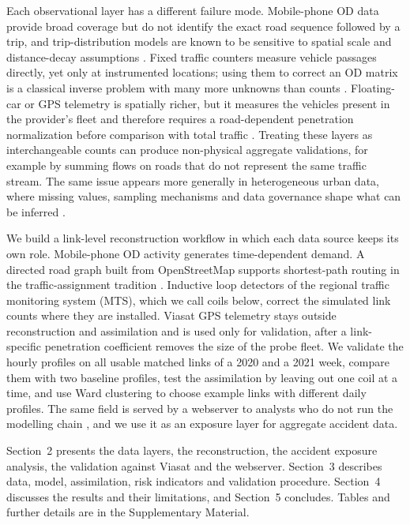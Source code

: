 \documentclass[pdflatex,Numbered]{sn-jnl}
\begin{document}
Each observational layer has a different failure mode. Mobile-phone OD data provide broad coverage but do not identify the exact road sequence followed by a trip, and trip-distribution models are known to be sensitive to spatial scale and distance-decay assumptions \cite{simini2012,lenormand2016,halas2014,martinez2013}. Fixed traffic counters measure vehicle passages directly, yet only at instrumented locations; using them to correct an OD matrix is a classical inverse problem with many more unknowns than counts \cite{cascetta1984}. Floating-car or GPS telemetry is spatially richer, but it measures the vehicles present in the provider's fleet and therefore requires a road-dependent penetration normalization before comparison with total traffic
\cite{herrera2010,work2010,seo2015,seo2017}. Treating these layers as interchangeable counts can produce non-physical aggregate validations, for example by summing
flows on roads that do not represent the same traffic stream. The same issue appears more generally in heterogeneous urban data, where missing values, sampling mechanisms and data governance shape what can be inferred \cite{aste2015,little2019,kitchin2016}.

We build a link-level reconstruction workflow in which each data source keeps its own role. Mobile-phone OD activity generates time-dependent demand. A directed road graph built from OpenStreetMap \cite{osm,boeing2017} supports shortest-path routing \cite{dijkstra1959} in the traffic-assignment tradition \cite{wardrop1952,sheffi1985}. Inductive loop detectors of the regional traffic monitoring system (MTS), which we call coils below, correct the simulated link counts where they are installed. Viasat GPS telemetry stays outside reconstruction and assimilation and is used only for validation, after a link-specific penetration coefficient removes the size of the probe fleet. We validate the hourly profiles on all usable matched links of a 2020 and a 2021 week, compare them with two baseline profiles, test the assimilation by leaving out one coil at a time, and use Ward clustering \cite{ward1963,murtagh2014} to choose example links with different daily profiles. The same field is served by a webserver to analysts who do not run the modelling chain \cite{batty2013,peldon2024}, and we use it as an exposure layer for aggregate accident data.

Section~2 presents the data layers, the reconstruction, the accident exposure analysis, the validation against Viasat and the webserver. Section~3 describes data, model, assimilation, risk indicators and validation procedure. Section~4 discusses the results and their limitations, and Section~5 concludes. Tables and further details are in the Supplementary Material.
\end{document}
